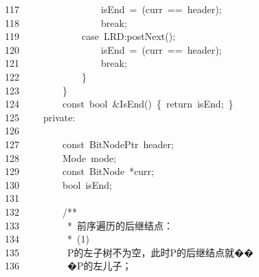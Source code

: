 \documentclass[11pt,a4paper]{ctexart}
\newcommand{\hlstd}[1]{\textcolor[rgb]{0.2,0.2,0.2}{#1}}
\newcommand{\hlcom}[1]{\textcolor[rgb]{0.59,0.59,0.59}{#1}}
\newcommand{\hlopt}[1]{\textcolor[rgb]{0.2,0.2,0.2}{#1}}
\newcommand{\hllin}[1]{\textcolor[rgb]{0.59,0.59,0.59}{#1}}
\newcommand{\hlkwa}[1]{\textcolor[rgb]{0.23,0.42,0.78}{#1}}
\newcommand{\hlkwb}[1]{\textcolor[rgb]{0.63,0,0.31}{#1}}
\newcommand{\hlkwc}[1]{\textcolor[rgb]{0,0.63,0.31}{#1}}
\newcommand{\hlkwd}[1]{\textcolor[rgb]{0.78,0.23,0.41}{#1}}
\begin{document}
\hllin{117\ }\hlstd{}\hlstd{\ \ \ \ \ \ \ \ \ \ \ \ \ \ \ \ }\hlstd{isEnd\ }\hlopt{=\ (}\hlstd{curr\ }\hlopt{==\ }\hlstd{header}\hlopt{);}\\
\hllin{118\ }\hlstd{}\hlstd{\ \ \ \ \ \ \ \ \ \ \ \ \ \ \ \ }\hlstd{}\hlkwa{break}\hlstd{}\hlopt{;}\\
\hllin{119\ }\hlstd{}\hlstd{\ \ \ \ \ \ \ \ \ \ \ \ }\hlstd{}\hlkwa{case\ }\hlstd{LRD}\hlopt{:}\hlstd{}\hlkwd{postNext}\hlstd{}\hlopt{();}\\
\hllin{120\ }\hlstd{}\hlstd{\ \ \ \ \ \ \ \ \ \ \ \ \ \ \ \ }\hlstd{isEnd\ }\hlopt{=\ (}\hlstd{curr\ }\hlopt{==\ }\hlstd{header}\hlopt{);}\\
\hllin{121\ }\hlstd{}\hlstd{\ \ \ \ \ \ \ \ \ \ \ \ \ \ \ \ }\hlstd{}\hlkwa{break}\hlstd{}\hlopt{;}\\
\hllin{122\ }\hlstd{}\hlstd{\ \ \ \ \ \ \ \ \ \ \ \ }\hlstd{}\hlopt{\}}\\
\hllin{123\ }\hlstd{}\hlstd{\ \ \ \ \ \ \ \ }\hlstd{}\hlopt{\}}\\
\hllin{124\ }\hlstd{}\hlstd{\ \ \ \ \ \ \ \ }\hlstd{}\hlkwb{const\ bool\ }\hlstd{}\hlopt{\&}\hlstd{}\hlkwd{IsEnd}\hlstd{}\hlopt{()\ \{\ }\hlstd{}\hlkwa{return\ }\hlstd{isEnd}\hlopt{;\ \}}\\
\hllin{125\ }\hlstd{}\hlstd{\ \ \ \ }\hlstd{}\hlkwc{private}\hlstd{}\hlopt{:}\\
\hllin{126\ }\hlstd{}\\
\hllin{127\ }\hlstd{}\hlstd{\ \ \ \ \ \ \ \ }\hlstd{}\hlkwb{const\ }\hlstd{BitNodePtr\ header}\hlopt{;}\\
\hllin{128\ }\hlstd{}\hlstd{\ \ \ \ \ \ \ \ }\hlstd{Mode\ mode}\hlopt{;}\\
\hllin{129\ }\hlstd{}\hlstd{\ \ \ \ \ \ \ \ }\hlstd{}\hlkwb{const\ }\hlstd{BitNode\ }\hlopt{{*}}\hlstd{curr}\hlopt{;}\\
\hllin{130\ }\hlstd{}\hlstd{\ \ \ \ \ \ \ \ }\hlstd{}\hlkwb{bool\ }\hlstd{isEnd}\hlopt{;}\\
\hllin{131\ }\hlstd{}\\
\hllin{132\ }\hlstd{}\hlstd{\ \ \ \ \ \ \ \ }\hlstd{}\hlcom{/{*}{*}}\\
\hllin{133\ }\hlcom{}\hlstd{\ \ \ \ \ \ \ \ \ }\hlcom{{*}\ 前序遍历的后继结点：}\\
\hllin{134\ }\hlcom{}\hlstd{\ \ \ \ \ \ \ \ \ }\hlcom{{*}\ (1)}\Righttorque\\
\hllin{135\ }\hlcom{}\hlstd{\ \ \ \ \ \ \ \ \ }\hlcom{P的左子树不为空，此时P的后继结点就��}\Righttorque\\
\hllin{136\ }\hlcom{}\hlstd{\ \ \ \ \ \ \ \ \ }\hlcom{�P的左儿子；}\\
\end{document}
